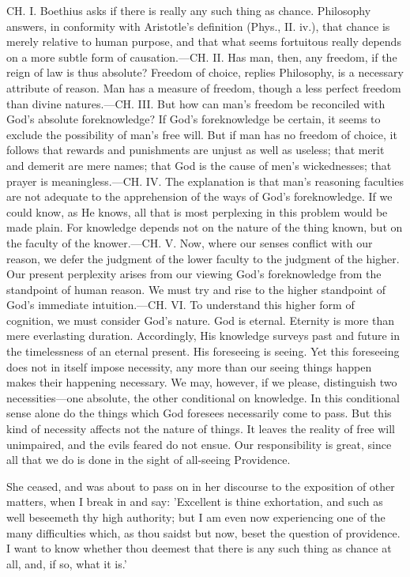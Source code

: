 CH. I. Boethius asks if there is really any such thing as chance.
Philosophy answers, in conformity with Aristotle's definition
(Phys., II. iv.), that chance is merely relative to human purpose,
and that what seems fortuitous really depends on a more subtle form
of causation.—CH. II. Has man, then, any freedom, if the reign of
law is thus absolute? Freedom of choice, replies Philosophy, is a
necessary attribute of reason. Man has a measure of freedom, though
a less perfect freedom than divine natures.—CH. III. But how can
man's freedom be reconciled with God's absolute foreknowledge? If
God's foreknowledge be certain, it seems to exclude the possibility
of man's free will. But if man has no freedom of choice, it
follows that rewards and punishments are unjust as well as useless;
that merit and demerit are mere names; that God is the cause of
men's wickednesses; that prayer is meaningless.—CH. IV. The
explanation is that man's reasoning faculties are not adequate to
the apprehension of the ways of God's foreknowledge. If we could
know, as He knows, all that is most perplexing in this problem
would be made plain. For knowledge depends not on the nature of the
thing known, but on the faculty of the knower.—CH. V. Now, where
our senses conflict with our reason, we defer the judgment of the
lower faculty to the judgment of the higher. Our present perplexity
arises from our viewing God's foreknowledge from the standpoint of
human reason. We must try and rise to the higher standpoint of
God's immediate intuition.—CH. VI. To understand this higher form
of cognition, we must consider God's nature. God is eternal.
Eternity is more than mere everlasting duration. Accordingly, His
knowledge surveys past and future in the timelessness of an eternal
present. His foreseeing is seeing. Yet this foreseeing does not in
itself impose necessity, any more than our seeing things happen
makes their happening necessary. We may, however, if we please,
distinguish two necessities—one absolute, the other conditional on
knowledge. In this conditional sense alone do the things which God
foresees necessarily come to pass. But this kind of necessity
affects not the nature of things. It leaves the reality of free
will unimpaired, and the evils feared do not ensue. Our
responsibility is great, since all that we do is done in the sight
of all-seeing Providence.


She ceased, and was about to pass on in her discourse to the exposition
of other matters, when I break in and say: 'Excellent is thine
exhortation, and such as well beseemeth thy high authority; but I am
even now experiencing one of the many difficulties which, as thou saidst
but now, beset the question of providence. I want to know whether thou
deemest that there is any such thing as chance at all, and, if so, what
it is.'

